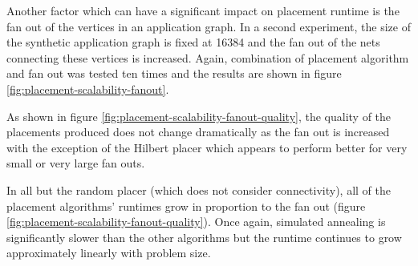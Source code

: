 				Another factor which can have a significant impact on placement runtime
				is the fan out of the vertices in an application graph. In a second
				experiment, the size of the synthetic application graph is fixed at
				\num{16384} and the fan out of the nets connecting these vertices is
				increased. Again, combination of placement algorithm and fan out was
				tested ten times and the results are shown in figure
				\ref{fig:placement-scalability-fanout}.
				
				As shown in figure \ref{fig:placement-scalability-fanout-quality}, the
				quality of the placements produced does not change dramatically as the
				fan out is increased with the exception of the Hilbert placer which
				appears to perform better for very small or very large fan outs.
				
				In all but the random placer (which does not consider connectivity),
				all of the placement algorithms' runtimes grow in proportion to the fan
				out (figure \ref{fig:placement-scalability-fanout-quality}). Once
				again, simulated annealing is significantly slower than the other
				algorithms but the runtime continues to grow approximately linearly
				with problem size.
